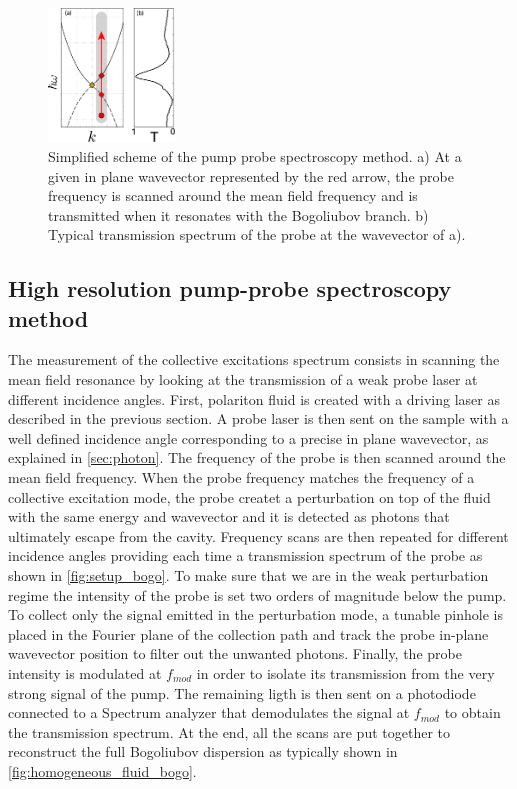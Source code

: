 \begin{figure}[h]
    \centering
    \includegraphics[width=0.3\textwidth]{chap_custom_st/fig/setup_bogoliubov.pdf}
    \caption{Simplified scheme of the pump probe spectroscopy method. a) At a given in plane wavevector represented by the red arrow, the probe frequency is scanned around the mean field frequency and is transmitted when it resonates with the Bogoliubov branch. b) Typical transmission spectrum of the probe at the wavevector of a).}
    \label{fig:setup_bogo}
\end{figure}


\subsection{High resolution pump-probe spectroscopy method}

\label{sub:high_resolution_spectroscopy}

The measurement of the collective excitations spectrum consists in scanning the mean field resonance by looking at the transmission of a weak probe laser at different incidence angles. First, polariton fluid is created with a driving laser as described in the previous section. A probe laser is then sent on the sample with a well defined incidence angle corresponding to a precise in plane wavevector, as explained in \autoref{sec:photon}. The frequency of 
the probe is then scanned around the mean field frequency. When the probe frequency matches the frequency of a collective excitation mode, the probe createt a perturbation on top of the fluid with the same energy and wavevector  and it is detected as photons that ultimately escape from the cavity. Frequency scans are then repeated for different incidence angles providing each time a transmission spectrum of the probe as shown in \autoref{fig:setup_bogo}. 
To make sure that we are in the weak perturbation regime the intensity of the probe is set two orders of magnitude below the pump. To collect only the signal emitted in the perturbation mode, a tunable pinhole is placed in the Fourier plane of the collection path and track the probe in-plane wavevector position to filter out the unwanted photons. Finally, the probe intensity is modulated at $f_{mod}$ in order to isolate its transmission from the very strong signal of the pump. The remaining ligth is then sent on
a photodiode connected to a Spectrum analyzer that demodulates the signal at $f_{mod}$ to obtain the transmission spectrum. At the end, all the scans are put together to reconstruct the full Bogoliubov dispersion as typically shown in \autoref{fig:homogeneous_fluid_bogo}.



